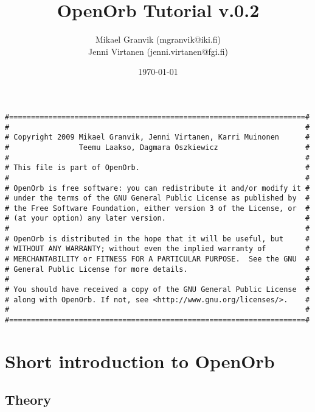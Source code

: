 \documentclass[12pt,english,twoside,a4paper]{report}
\title{OpenOrb Tutorial v.0.2}
\author{Mikael Granvik (mgranvik@iki.fi) \\ Jenni Virtanen (jenni.virtanen@fgi.fi)}
\date{\today}
\begin{document}
\maketitle
{}

\setcounter{page}{1}

\begin{verbatim}
#====================================================================#
#                                                                    #
# Copyright 2009 Mikael Granvik, Jenni Virtanen, Karri Muinonen      #
#                Teemu Laakso, Dagmara Oszkiewicz                    #
#                                                                    #
# This file is part of OpenOrb.                                      #
#                                                                    #
# OpenOrb is free software: you can redistribute it and/or modify it #
# under the terms of the GNU General Public License as published by  #
# the Free Software Foundation, either version 3 of the License, or  #
# (at your option) any later version.                                #
#                                                                    #
# OpenOrb is distributed in the hope that it will be useful, but     #
# WITHOUT ANY WARRANTY; without even the implied warranty of         #
# MERCHANTABILITY or FITNESS FOR A PARTICULAR PURPOSE.  See the GNU  #
# General Public License for more details.                           #
#                                                                    #
# You should have received a copy of the GNU General Public License  #
# along with OpenOrb. If not, see <http://www.gnu.org/licenses/>.    #
#                                                                    #
#====================================================================#
\end{verbatim}

\pagebreak

\tableofcontents

\pagebreak
{}
\setcounter{page}{1}

\chapter{Short introduction to OpenOrb}

\section{Theory}
\end{document}
